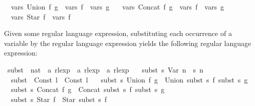 \begin{isabellebody}
\ \ {\isachardoublequoteopen}vars\ {\isacharparenleft}{\kern0pt}Union\ f\ g{\isacharparenright}{\kern0pt}\ {\isacharequal}{\kern0pt}\ vars\ f\ {\isasymunion}\ vars\ g{\isachardoublequoteclose}\ {\isacharbar}{\kern0pt}\isanewline
\ \ {\isachardoublequoteopen}vars\ {\isacharparenleft}{\kern0pt}Concat\ f\ g{\isacharparenright}{\kern0pt}\ {\isacharequal}{\kern0pt}\ vars\ f\ {\isasymunion}\ vars\ g{\isachardoublequoteclose}\ {\isacharbar}{\kern0pt}\isanewline
\ \ {\isachardoublequoteopen}vars\ {\isacharparenleft}{\kern0pt}Star\ f{\isacharparenright}{\kern0pt}\ {\isacharequal}{\kern0pt}\ vars\ f{\isachardoublequoteclose}%
\begin{isamarkuptext}%
Given some regular language expression, substituting each occurrence of a variable  by
the regular language expression  yields the following regular language expression:%
\end{isamarkuptext}\isamarkuptrue%
\isamarkupfalse%
\ subst\ {\isacharcolon}{\kern0pt}{\isacharcolon}{\kern0pt}\ {\isachardoublequoteopen}{\isacharparenleft}{\kern0pt}nat\ {\isasymRightarrow}\ {\isacharprime}{\kern0pt}a\ rlexp{\isacharparenright}{\kern0pt}\ {\isasymRightarrow}\ {\isacharprime}{\kern0pt}a\ rlexp\ {\isasymRightarrow}\ {\isacharprime}{\kern0pt}a\ rlexp{\isachardoublequoteclose}\ \isanewline
\ \ {\isachardoublequoteopen}subst\ s\ {\isacharparenleft}{\kern0pt}Var\ n{\isacharparenright}{\kern0pt}\ {\isacharequal}{\kern0pt}\ s\ n{\isachardoublequoteclose}\ {\isacharbar}{\kern0pt}\isanewline
\ \ {\isachardoublequoteopen}subst\ {\isacharunderscore}{\kern0pt}\ {\isacharparenleft}{\kern0pt}Const\ l{\isacharparenright}{\kern0pt}\ {\isacharequal}{\kern0pt}\ Const\ l{\isachardoublequoteclose}\ {\isacharbar}{\kern0pt}\isanewline
\ \ {\isachardoublequoteopen}subst\ s\ {\isacharparenleft}{\kern0pt}Union\ f\ g{\isacharparenright}{\kern0pt}\ {\isacharequal}{\kern0pt}\ Union\ {\isacharparenleft}{\kern0pt}subst\ s\ f{\isacharparenright}{\kern0pt}\ {\isacharparenleft}{\kern0pt}subst\ s\ g{\isacharparenright}{\kern0pt}{\isachardoublequoteclose}\ {\isacharbar}{\kern0pt}\isanewline
\ \ {\isachardoublequoteopen}subst\ s\ {\isacharparenleft}{\kern0pt}Concat\ f\ g{\isacharparenright}{\kern0pt}\ {\isacharequal}{\kern0pt}\ Concat\ {\isacharparenleft}{\kern0pt}subst\ s\ f{\isacharparenright}{\kern0pt}\ {\isacharparenleft}{\kern0pt}subst\ s\ g{\isacharparenright}{\kern0pt}{\isachardoublequoteclose}\ {\isacharbar}{\kern0pt}\isanewline
\ \ {\isachardoublequoteopen}subst\ s\ {\isacharparenleft}{\kern0pt}Star\ f{\isacharparenright}{\kern0pt}\ {\isacharequal}{\kern0pt}\ Star\ {\isacharparenleft}{\kern0pt}subst\ s\ f{\isacharparenright}{\kern0pt}{\isachardoublequoteclose}%

\end{isabellebody}
